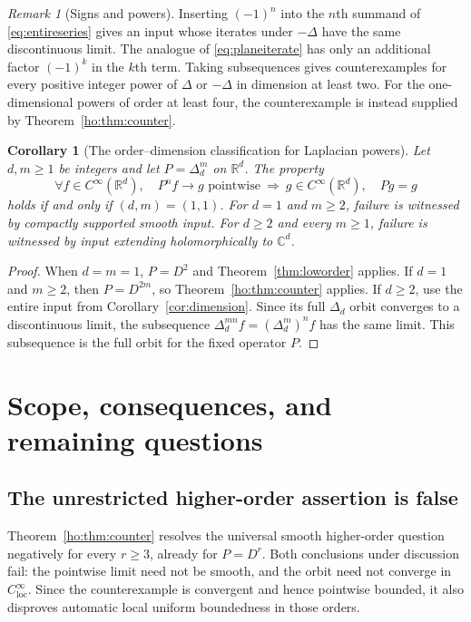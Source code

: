 \documentclass[11pt,reqno]{amsart}
\numberwithin{equation}{section}
\newtheorem{corollary}[theorem]{Corollary}
\theoremstyle{definition}
\theoremstyle{remark}
\newtheorem{remark}[theorem]{Remark}
\newcommand{\R}{\mathbb R}
\newcommand{\C}{\mathbb C}
\newcommand{\loc}{\mathrm{loc}}
\begin{document}
\begin{remark}[Signs and powers]
Inserting $(-1)^n$ into the $n$th summand of \eqref{eq:entireseries} gives an input whose iterates under $-\Delta$ have the same discontinuous limit. The analogue of \eqref{eq:planeiterate} has only an additional factor $(-1)^k$ in the $k$th term. Taking subsequences gives counterexamples for every positive integer power of $\Delta$ or $-\Delta$ in dimension at least two. For the one-dimensional powers of order at least four, the counterexample is instead supplied by Theorem~\ref{ho:thm:counter}.
\end{remark}


\begin{corollary}[The order--dimension classification for Laplacian powers]\label{cor:polyharmonic}
Let $d,m\ge1$ be integers and let $P=\Delta_d^m$ on $\R^d$. The property
\[
 \forall f\in C^\infty(\R^d),\quad
 P^nf\to g\text{ pointwise}
 \ \Longrightarrow\ g\in C^\infty(\R^d),\quad Pg=g
\]
holds if and only if $(d,m)=(1,1)$.
For $d=1$ and $m\ge2$, failure is witnessed by compactly supported smooth input. For $d\ge2$ and every $m\ge1$, failure is witnessed by input extending holomorphically to $\C^d$.
\end{corollary}
\begin{proof}
When $d=m=1$, $P=D^2$ and Theorem~\ref{thm:loworder} applies. If $d=1$ and $m\ge2$, then $P=D^{2m}$, so Theorem~\ref{ho:thm:counter} applies. If $d\ge2$, use the entire input from Corollary~\ref{cor:dimension}. Since its full $\Delta_d$ orbit converges to a discontinuous limit, the subsequence $\Delta_d^{mn}f=(\Delta_d^m)^nf$ has the same limit. This subsequence is the full orbit for the fixed operator $P$.
\end{proof}

\section{Scope, consequences, and remaining questions}\label{sec:scope}
\subsection{The unrestricted higher-order assertion is false}
Theorem~\ref{ho:thm:counter} resolves the universal smooth higher-order question negatively for every $r\ge3$, already for $P=D^r$. Both conclusions under discussion fail: the pointwise limit need not be smooth, and the orbit need not converge in $C^\infty_{\loc}$. Since the counterexample is convergent and hence pointwise bounded, it also disproves automatic local uniform boundedness in those orders.
\end{document}
